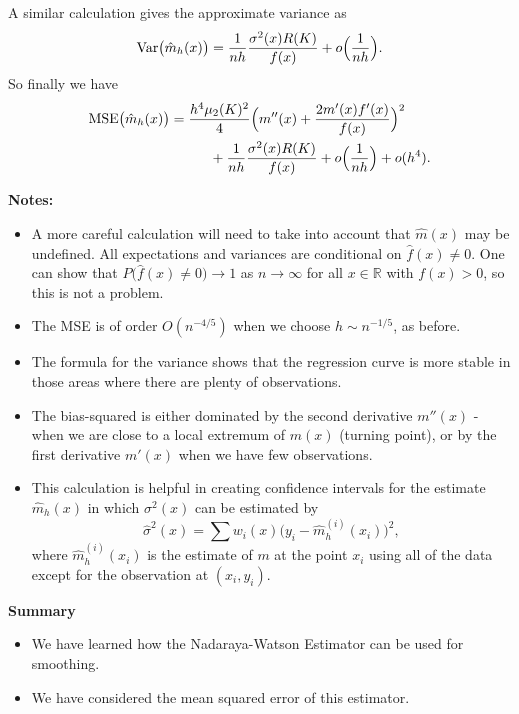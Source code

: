 \documentclass[
  a4paper,
]{article}
\providecommand{\tightlist}{%
  \setlength{\itemsep}{0pt}\setlength{\parskip}{0pt}}
\theoremstyle{definition}
\theoremstyle{definition}
\theoremstyle{definition}
\theoremstyle{definition}
\theoremstyle{remark}
\begin{document}
A similar calculation gives the approximate variance as
\begin{equation*}
  \mathop{\mathrm{Var}}\bigl( \hat m_h(x) \bigr)
  = \frac{1}{nh} \frac{\sigma^2(x) R(K)}{f(x)} + o\Bigl( \frac{1}{nh} \Bigr).
\end{equation*}
So finally we have
\begin{align*}
  \mathop{\mathrm{MSE}}\nolimits\bigl( \hat m_h(x) \bigr)
  &= \frac{h^4 \mu_2(K)^2}{4} \Bigl(m''(x) +\frac{2m'(x) f'(x)}{f(x)} \Bigr)^2 \\
  &\hskip1cm + \frac{1}{nh} \frac{\sigma^2(x) R(K)}{f(x)} + o\Bigl( \frac{1}{nh} \Bigr) + o(h^4).
\end{align*}

\textbf{Notes:}

\begin{itemize}
\tightlist
\item
  A more careful calculation will need to take into account that \(\hat m(x)\)
  may be undefined. All expectations and variances are conditional on
  \(\hat f(x) \neq 0\). One can show that \(P\bigl( \hat f(x) \neq 0 \bigr) \to 1\)
  as \(n\to\infty\) for all \(x\in\mathbb{R}\) with \(f(x) > 0\), so this is not a problem.
\item
  The MSE is of order \(O(n^{-4/5})\) when we choose \(h \sim n^{-1/5}\), as before.
\item
  The formula for the variance shows that the regression curve is more stable
  in those areas where there are plenty of observations.
\item
  The bias-squared is either dominated by the second derivative
  \(m''(x)\) - when we are close to a local extremum of \(m(x)\) (turning point),
  or by the first derivative \(m'(x)\) when we have few observations.
\item
  This calculation is helpful in creating confidence intervals for the estimate
  \(\hat m_h(x)\) in which \(\sigma^2(x)\) can be estimated by
  \[\hat \sigma^2(x) = \sum w_i(x) \bigl( y_i-\hat m_h^{(i)}(x_i) \bigr)^2,\]
  where \(\hat m_h^{(i)}(x_i)\) is the estimate of \(m\) at the point \(x_i\) using
  all of the data except for the observation at \((x_i, y_i)\).
\end{itemize}

\textbf{Summary}

\begin{itemize}
\tightlist
\item
  We have learned how the Nadaraya-Watson Estimator can be used
  for smoothing.
\item
  We have considered the mean squared error of this estimator.
\end{itemize}
\end{document}
